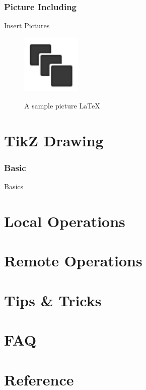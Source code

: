 ﻿\documentclass{beamer}
\begin{document}
\section[Picture Including]{Picture Including}
\begin{frame}{Insert Pictures}
\begin{figure}[htbp]
  \centering
  \includegraphics[width=80pt]{sample.png}\\
  \caption{A sample picture \LaTeX}
  \label{fig:sample}
\end{figure}
\end{frame}


\part[TikZ Drawing]{TikZ Drawing}
\section[Basic]{Basic}
\begin{frame}{Basics}
\begin{figure}
  \centering
\end{figure}
\end{frame}


\part[Local Operations]{Local Operations}
\begin{frame}
\end{frame}


\part[Remote Operations]{Remote Operations}
\begin{frame}
\end{frame}


\part[Tips \& Tricks]{Tips \& Tricks}
\begin{frame}
\end{frame}


\part[FAQ]{FAQ}
\begin{frame}
\end{frame}


\part[Reference]{Reference}
\end{document}
